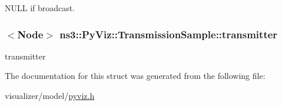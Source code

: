 N\+U\+LL if broadcast. 

\subsubsection[{\texorpdfstring{transmitter}{transmitter}}]{$<${\bf Node}$>$ ns3\+::\+Py\+Viz\+::\+Transmission\+Sample\+::transmitter}\hypertarget{structns3_1_1PyViz_1_1TransmissionSample_a73327e8f2aba9c087cd4db2aa1d0a962}{}\label{structns3_1_1PyViz_1_1TransmissionSample_a73327e8f2aba9c087cd4db2aa1d0a962}


transmitter 



The documentation for this struct was generated from the following file\+:\begin{DoxyCompactItemize}
\item 
visualizer/model/\hyperlink{pyviz_8h}{pyviz.\+h}\end{DoxyCompactItemize}
